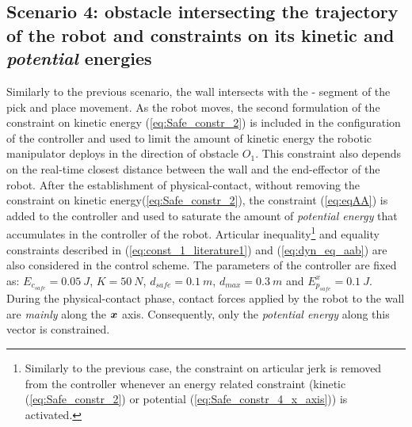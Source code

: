 \subsection{Scenario 4: obstacle intersecting the trajectory of the robot and constraints on its kinetic and \textit{potential} energies}
Similarly to the previous scenario, the wall intersects with the - segment of the pick and place movement. As the robot moves, the second formulation of the constraint on kinetic energy (\ref{eq:Safe_constr_2}) is included in the configuration of the controller and used to limit the amount of kinetic energy the robotic manipulator deploys in the direction of obstacle $O_1$. This constraint also depends on the real-time closest distance between the wall and the end-effector of the robot. After the establishment of physical-contact, without removing the constraint on kinetic energy(\ref{eq:Safe_constr_2}), the constraint (\ref{eq:eqAA}) is added to the controller and used to saturate the amount of \textit{potential energy} that accumulates in the controller of the robot. Articular inequality\footnote{Similarly to the previous case, the constraint on articular jerk is removed from the controller whenever an energy related constraint (kinetic (\ref{eq:Safe_constr_2}) or  potential (\ref{eq:Safe_constr_4_x_axis})) is activated.} and equality constraints described in (\ref{eq:const_1_literature1}) and (\ref{eq:dyn_eq_aab}) are also considered in the control scheme. The parameters of the controller are fixed as: $E_{c_{safe}} = 0.05~J$, $K = 50~N$, $d_{safe} = 0.1~m$, $d_{max} = 0.3~m$ and $E_{p_{safe}}^{x} = 0.1~J$. During the physical-contact phase, contact forces applied by the robot to the wall are \textit{mainly} along the $\mbox{\boldmath${x}$}$ axis. Consequently, only the \textit{potential energy} along this vector is constrained. 

